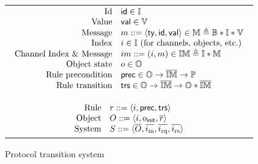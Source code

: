 \documentclass[sigplan,10pt,review,anonymous,screen]{acmart}\settopmatter{printfolios=true,printccs=false,printacmref=false}
\begin{document}
\begin{figure}[t]
  \centering\small
  \setlength{\tabcolsep}{0pt}
  \def\arraystretch{1.1}
  \begin{tabular}{|c|}
    \hline
    \begin{math}
      \begin{array}{rl}
        \textrm{Id} & \textsf{id}{} \in \mathbb{I}{} \\
        \textrm{Value} & \textsf{val}{} \in \mathbb{V}{} \\
        \textrm{Message} & m ::= \langle \textsf{ty}, \textsf{id}, \textsf{val} \rangle \in \mathbb{M}{} \triangleq \mathbb{B} \ast \mathbb{I} \ast \mathbb{V} \\
        \textrm{Index} & i \in \mathbb{I}{}\ \textrm{(for channels, objects, etc.)} \\
        \textrm{Channel Index \& Message} & im ::= (i, m) \in \mathbb{IM} \triangleq \mathbb{I} \ast \mathbb{M} \\
        \textrm{Object state} & o \in \mathbb{O}{} \\
        \textrm{Rule precondition} & \textsf{prec}{} \in \mathbb{O} \to \overline{\mathbb{IM}} \to \mathbb{P} \\
        \textrm{Rule transition} & \textsf{trs}{} \in \mathbb{O} \to \overline{\mathbb{IM}} \to \mathbb{O} \ast \overline{\mathbb{IM}}\\
      \end{array}
    \end{math}\\
    \mbox{}\vspace{-10pt} \\ %
    \hline
    \mbox{}\vspace{-10pt} \\ %
    \begin{math}
      \begin{array}{rl}
        \textrm{Rule} & r ::= \langle i, \textsf{prec}{}, \textsf{trs}{} \rangle \\
        \textrm{Object} & O ::= \langle i, o_{\textsf{init}}, \overline{r} \rangle \\
        \textrm{System} & S ::= \langle \overline{O}, \overline{i_{\textrm{in}}}, \overline{i_{\textrm{rq}}}, \overline{i_{\textrm{rs}}} \rangle \\
      \end{array}
    \end{math}\\
    \hline
  \end{tabular}
  \caption{Protocol transition system}
  \label{fig-trs-system}
\end{figure}
\end{document}
